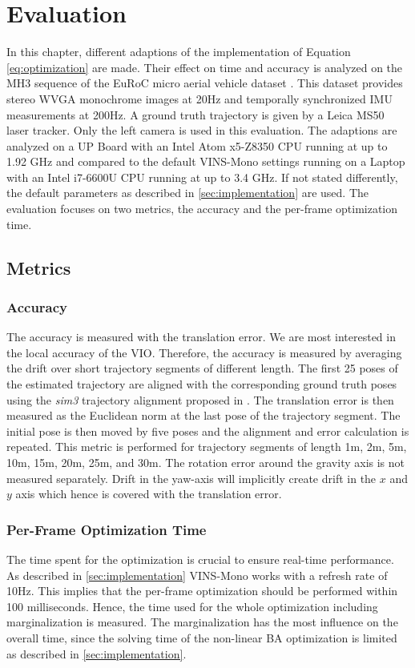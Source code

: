 \chapter{Evaluation}
\label{ch:evaluation}

In this chapter, different adaptions of the implementation of Equation 
\eqref{eq:optimization} are made. Their effect on time and accuracy is 
analyzed on the MH3 sequence of the EuRoC micro aerial vehicle dataset 
\citep{Burri2016EuRoC}. This dataset provides stereo WVGA monochrome images at 
20Hz and temporally synchronized \ac{IMU} measurements at 200Hz. A ground truth 
trajectory is given by a Leica MS50 laser tracker. Only the left camera is used 
in this evaluation. The adaptions are analyzed on a UP Board with an Intel 
Atom x5-Z8350 CPU running at up to 1.92 GHz and compared to the default 
VINS-Mono settings running on a Laptop with an Intel i7-6600U CPU running at up 
to 3.4 GHz. If not stated differently, the default parameters as described in 
\autoref{sec:implementation} are used. The evaluation focuses on two metrics, 
the accuracy and the per-frame optimization time.   

\section{Metrics}\label{sec:metrics}
\subsection{Accuracy} \label{subsec:accuracy}
The accuracy is measured with the translation error. We are most interested in 
the local accuracy of the \ac{VIO}. Therefore, the accuracy is measured by 
averaging the drift over short trajectory segments of different length. The 
first 25 poses of the estimated trajectory are aligned with the corresponding 
ground truth poses using the \textit{sim3} trajectory alignment proposed in 
\cite{Umeyama1991}. The translation error is then measured as the Euclidean norm 
at the last pose of the trajectory segment. The initial pose is then moved by 
five poses and the alignment and error calculation is repeated. This metric is 
performed for trajectory segments of length 1m, 2m, 5m, 10m, 15m, 20m, 25m, and 
30m. The rotation error around the gravity axis is not measured separately. 
Drift in the yaw-axis will implicitly create drift in the $x$ and $y$ axis which 
hence is covered with the translation error.

\subsection{Per-Frame Optimization Time} 
The time spent for the optimization is crucial to ensure real-time performance. 
As described in \autoref{sec:implementation} VINS-Mono works with a refresh 
rate of 10Hz. This implies that the per-frame optimization should be performed 
within 100 milliseconds. Hence, the time used for the whole optimization 
including marginalization is measured. The marginalization has the most 
influence on the overall time, since the solving time of the non-linear \ac{BA} 
optimization is limited as described in \autoref{sec:implementation}. 


